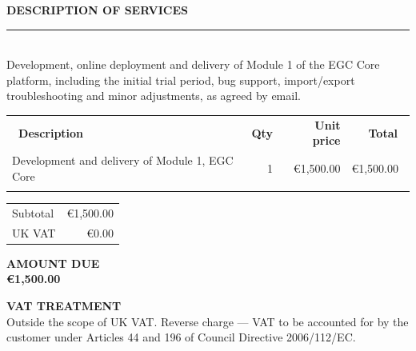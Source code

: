 \documentclass[10.5pt]{article}
\newcommand{\sectiontitle}[1]{%
  {\headingfont\bfseries\fontsize{9.5}{9.5}\selectfont\color{navy}\MakeUppercase{#1}}\\[1pt]
  {\color{gold}\rule{\linewidth}{0.9pt}}\\[7pt]
}
\newcommand{\lbl}[1]{{\color{slate}\footnotesize #1}}
\begin{document}
\vspace{0.5cm}

\sectiontitle{Description of services}
\RaggedRight
Development, online deployment and delivery of Module 1 of the EGC Core platform, including the initial trial period, bug support, import/export troubleshooting and minor adjustments, as agreed by email.

\vspace{0.4cm}

\renewcommand{\arraystretch}{1.6}
\begin{tabularx}{\linewidth}{X r r r}
  \rowcolor{navy}
  {\headingfont\footnotesize\bfseries\color{white}\ Description} &
  {\headingfont\footnotesize\bfseries\color{white} Qty} &
  {\headingfont\footnotesize\bfseries\color{white} Unit price} &
  {\headingfont\footnotesize\bfseries\color{white} Total\ } \\
  Development and delivery of Module 1, EGC Core & 1 & €1,500.00 & €1,500.00\ \\
  \arrayrulecolor{hair}\hline
\end{tabularx}

\vspace{0.35cm}

\begin{flushright}
\begin{tabular}{@{}l r@{}}
  \lbl{Subtotal} & €1,500.00 \\[2pt]
  \lbl{UK VAT} & €0.00 \\[6pt]
\end{tabular}

\begin{tcolorbox}[
    colback=navy, colframe=navy, arc=1pt,
    left=10pt, right=10pt, top=6pt, bottom=6pt,
    width=5.6cm, halign=right
  ]
  {\headingfont\footnotesize\color{gold}\bfseries AMOUNT DUE}\\[2pt]
  {\headingfont\fontsize{16}{16}\selectfont\bfseries\color{white} €1,500.00}
\end{tcolorbox}
\end{flushright}

\vspace{0.4cm}

\begin{tcolorbox}[
    colback=tint, colframe=hair, boxrule=0.6pt, arc=1pt,
    left=10pt, right=10pt, top=7pt, bottom=7pt
  ]
  {\headingfont\footnotesize\bfseries\color{navy}\MakeUppercase{VAT treatment}}\\[4pt]
  \footnotesize Outside the scope of UK VAT. Reverse charge --- VAT to be accounted for by the customer under Articles 44 and 196 of Council Directive 2006/112/EC.
\end{tcolorbox}
\end{document}
